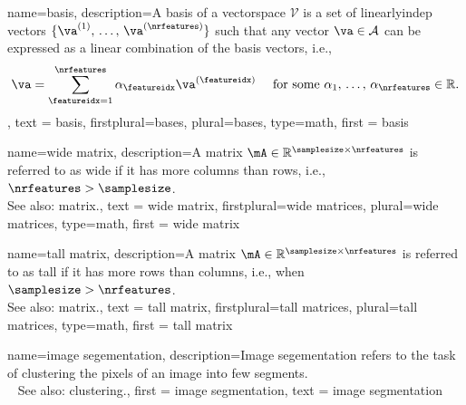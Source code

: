 {name={basis},
	description={A basis of a \gls{vectorspace} $\mathcal{V}$ 
	is a set of \gls{linearlyindep} \glspl{vector} $\{\va^{(1)}, \,\ldots, \,\va^{(\nrfeatures)}\}$ such 
	that any vector $\va \in \mathcal{A}$ can be expressed as a linear combination 
	of the basis \glspl{vector}, i.e.,	
	$$ \va = \sum_{\featureidx=1}^{\nrfeatures} \alpha_{\featureidx} \va^{(\featureidx)} 
	\quad \text{ for some } \alpha_{1}, \,\ldots, \,\alpha_{\nrfeatures} \in \mathbb{R}. $$
	},
	text = {basis}, 
	firstplural={bases}, 
	plural={bases}, 
	type=math,
	first = {basis} 
}

{name={wide matrix},
 description={A \gls{matrix} 
   $\mA \in \mathbb{R}^{\samplesize \times \nrfeatures}$ 
	is referred to as wide if it has more columns than rows, i.e., $\nrfeatures > \samplesize$.\\ 
	See also: \gls{matrix}.},
	text = {wide matrix}, 
	firstplural={wide matrices}, 
	plural={wide matrices}, 
	type=math,
   first = {wide matrix} 
}

{name={tall matrix},
 description={A \gls{matrix} 
   $\mA \in \mathbb{R}^{\samplesize \times \nrfeatures}$ 
	is referred to as tall if it has more rows than columns, i.e., when $\samplesize > \nrfeatures$.\\ 
	See also: \gls{matrix}.},
	text = {tall matrix}, 
	firstplural={tall matrices}, 
	plural={tall matrices}, 
	type=math,
   first = {tall matrix} 
}

{name={image segementation}, 
 description={Image segementation refers to the task of 
    \gls{clustering} the pixels of an image into few segments.\\ 
 	See also: \gls{clustering}.}, 
 first = {image segmentation}, 
 text = {image segmentation}
 } 


